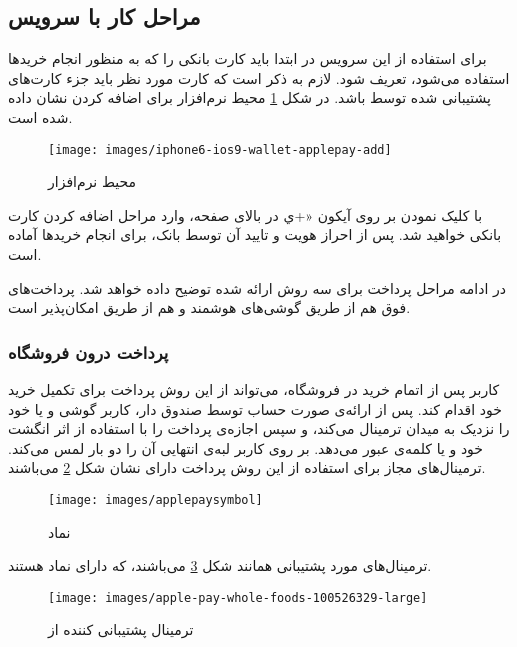 \documentclass[oneside]{report}
\begin{document}
	\subsection{مراحل کار با سرویس {\normalsize {}} }
	برای استفاده از این سرویس در ابتدا باید کارت بانکی را که به منظور انجام خرید‌ها استفاده می‌شود، تعریف شود. لازم به ذکر است که کارت مورد نظر باید جزء کارت‌های پشتیبانی شده توسط
									{\normalsize {}} 
									 باشد. در شکل \ref{applepayenvironment} محیط نرم‌افزار برای اضافه کردن نشان داده شده است. 
									 
									 
	\begin{figure}[h]
		\centering
		\texttt{[image: images/iphone6-ios9-wallet-applepay-add]}
		\caption{محیط نرم‌افزار  {\footnotesize {}}  }
		\label{applepayenvironment}
	\end{figure}
با کلیک نمودن بر روی آیکون «+ي ‌در بالای صفحه، وارد مراحل اضافه کردن کارت بانکی خواهید شد.  پس از احراز هویت و تایید آن توسط بانک،
								{\normalsize {}}  
								برای انجام خرید‌ها آماده است. 
								
								در ادامه مراحل پرداخت برای سه روش ارائه شده توضیح داده خواهد شد. پرداخت‌های فوق هم از طریق گوشی‌های هوشمند 
																{\normalsize {}} 
																و هم از طریق 
															{\normalsize {}} 
																								امکان‌پذیر است. 
											
								
	\subsubsection{پرداخت درون فروشگاه} 
	کاربر پس از اتمام خرید در فروشگاه، می‌تواند از این روش پرداخت برای تکمیل خرید خود اقدام کند. پس از  ارائه‌ی صورت حساب توسط صندوق دار، کاربر گوشی و یا 
														{\normalsize {}} 
	 خود را نزدیک به میدان 
									{\normalsize {}}
 ترمینال می‌کند، و سپس اجازه‌ی پرداخت را با استفاده از اثر انگشت خود و یا کلمه‌ی عبور می‌دهد.
 		بر روی  									{\normalsize {}}									 									 									کاربر لبه‌ی انتهایی آن را دو بار لمس می‌کند.
 ترمینال‌های مجاز برای استفاده از این روش پرداخت دارای نشان شکل     
 \ref{applepaysymbol}
می‌باشند.
 \begin{figure}[h]
 	\centering
 	\texttt{[image: images/applepaysymbol]}
 	\caption{نماد 	{\footnotesize {}}}
 	\label{applepaysymbol}
 \end{figure}

 ترمینال‌های مورد پشتیبانی همانند شکل 
 \ref{apple-pay-whole-foods}
 می‌باشند، که دارای نماد 
 									{\normalsize {}}
 									هستند.
	\begin{figure}[h]
		\centering
		\texttt{[image: images/apple-pay-whole-foods-100526329-large]}
		\caption{ترمینال پشتیبانی کننده از {\footnotesize {}}}
		\label{apple-pay-whole-foods}
	\end{figure}
	
\end{document}

